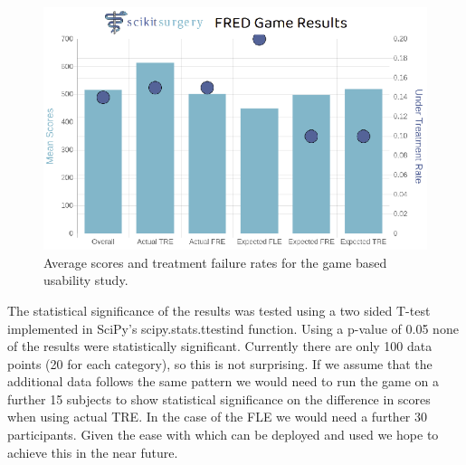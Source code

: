 \begin{figure}
        \begin{center}
        \includegraphics[width=0.5\linewidth]{usability.eps}
                \caption{\label{fig:usability}Average scores and treatment failure rates for the game based usability study.}
	\end{center}
\end{figure}

The statistical significance of the results was tested using a two sided T-test implemented
in {SciPy}'s\cite{2020SciPy-NMeth} {scipy.stats.ttest{\textunderscore}ind} function.
Using a p-value of 0.05 none of the results were statistically significant. 
Currently there are only 100 data points (20 for each category), so this is not 
surprising. If we assume that the additional data follows the same pattern we 
would need to run the game on a further 15 subjects to show statistical significance 
on the difference in scores when using actual \gls{TRE}. In the case of the 
\gls{FLE} we would need a further 30 participants. Given the ease with 
which \fred can be deployed and used we hope to achieve this in the near future.


